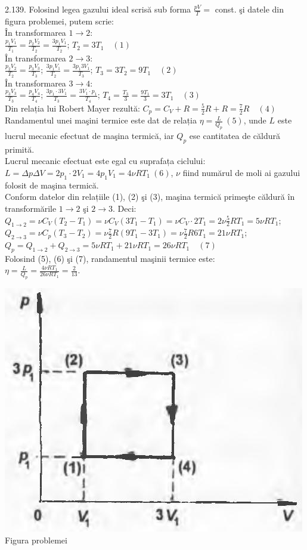 2.139. Folosind legea gazului ideal scrisă sub forma $\frac{p V}{T}=$ const. şi datele din figura problemei, putem scrie:\\ În transformarea $1 \rightarrow 2$:\\ $\frac{p_{1} V_{1}}{T_{1}}=\frac{p_{2} V_{2}}{T_{2}}=\frac{3 p_{1} V_{1}}{T_{2}}$; \quad $T_{2}=3 T_{1} \quad (1)$\\ În transformarea $2 \rightarrow 3$:\\ $\frac{p_{2} V_{2}}{T_{2}}=\frac{p_{3} V_{3}}{T_{3}}$; \quad $\frac{3 p_{1} V_{1}}{T_{2}}=\frac{3 p_{1} 3 V_{1}}{T_{3}}$; \quad $T_{3}=3 T_{2}=9 T_{1} \quad (2)$\\ În transformarea $3 \rightarrow 4$:\\ $\frac{p_{3} V_{3}}{T_{3}}=\frac{p_{4} V_{4}}{T_{4}}$; \quad $\frac{3 p_{1} \cdot 3 V_{1}}{T_{3}}=\frac{3 V_{1} \cdot p_{1}}{T_{4}}$; \quad $T_{4}=\frac{T_{3}}{3}=\frac{9 T_{1}}{3}=3 T_{1} \quad (3)$\\ Din relația lui Robert Mayer rezultă: $C_{p}=C_{V}+R=\frac{5}{2} R+R=\frac{7}{2} R \quad (4)$\\ Randamentul unei maşini termice este dat de relația $\eta=\frac{L}{Q_{p}}\ (5)$, unde $L$ este lucrul mecanic efectuat de maşina termică, iar $Q_{p}$ ese cantitatea de căldură primită.\\ Lucrul mecanic efectuat este egal cu suprafața ciclului:\\ $L=\Delta p \Delta V=2 p_{1} \cdot 2 V_{1}=4 p_{1} V_{1}=4 \nu R T_{1}\ (6)$, $\nu$ fiind numărul de moli ai gazului folosit de maşina termică.\\ Conform datelor din relațiile (1), (2) şi (3), maşina termică primeşte căldură în transformările $1 \rightarrow 2$ şi $2 \rightarrow 3$. Deci:\\ $Q_{1 \rightarrow 2}=\nu C_{V}\left(T_{2}-T_{1}\right)=\nu C_{V}\left(3 T_{1}-T_{1}\right)=\nu C_{V} \cdot 2 T_{1}=2 \nu \frac{5}{2} R T_{1}=5 \nu R T_{1}$;\\ $Q_{2 \rightarrow 3}=\nu C_{p}\left(T_{3}-T_{2}\right)=\nu \frac{7}{2} R\left(9 T_{1}-3 T_{1}\right)=\nu \frac{7}{2} R 6 T_{1}=21 \nu R T_{1}$;\\ $Q_{p}=Q_{1 \rightarrow 2}+Q_{2 \rightarrow 3}=5 \nu R T_{1}+21 \nu R T_{1}=26 \nu R T_{1} \quad (7)$\\ Folosind (5), (6) şi (7), randamentul maşinii termice este:\\ $\eta=\frac{L}{Q_{p}}=\frac{4 \nu R T_{1}}{26 \nu R T_{1}}=\frac{2}{13}$.\\ \begin{center} \includegraphics[width=0.4\linewidth]{images/2025_07_01_5b3ff9fa0d508c8e9f17g-297}\\ Figura problemei \end{center}\\

